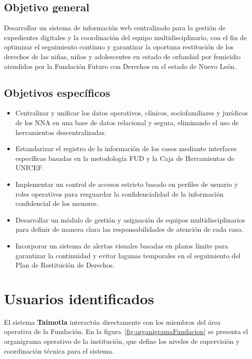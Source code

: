 \subsection{Objetivo general}

Desarrollar un sistema de información web centralizado para la gestión de expedientes digitales y la coordinación del equipo multidisciplinario, con el fin de optimizar el seguimiento continuo y garantizar la oportuna restitución de los derechos de las niñas, niños y adolescentes en estado de orfandad por femicidio atendidos por la Fundación Futuro con Derechos en el estado de Nuevo León.

\subsection{Objetivos específicos}

\begin{itemize}
	\item Centralizar y unificar los datos operativos, clínicos, sociofamiliares y jurídicos de los NNA en una base de datos relacional y segura, eliminando el uso de herramientas descentralizadas.
	\item Estandarizar el registro de la información de los casos mediante interfaces específicas basadas en la metodología FUD y la Caja de Herramientas de UNICEF.
	\item Implementar un control de accesos estricto basado en perfiles de usuario y roles operativos para resguardar la confidencialidad de la información confidencial de los menores.
	\item Desarrollar un módulo de gestión y asignación de equipos multidisciplinarios para definir de manera clara las responsabilidades de atención de cada caso.
	\item Incorporar un sistema de alertas visuales basadas en plazos límite para garantizar la continuidad y evitar lagunas temporales en el seguimiento del Plan de Restitución de Derechos.
\end{itemize}

\section{Usuarios identificados}

El sistema \textbf{Taimotla} interactúa directamente con los miembros del área operativa de la Fundación. En la figura~\ref{fig:organigramaFundacion} se presenta el organigrama operativo de la institución, que define los niveles de supervisión y coordinación técnica para el sistema.

